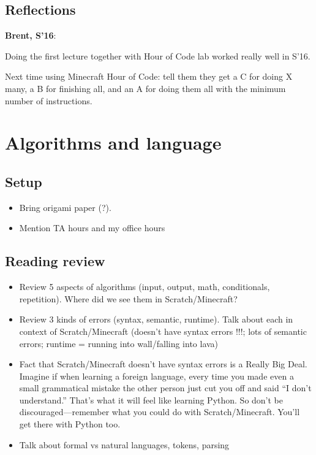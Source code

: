 \documentclass{article}
\newenvironment{reflect}[1]
{
  \begin{lrbox}{\reflectbox}
    \begin{minipage}[t]{\textwidth}
      \textbf{#1}:
}{
    \end{minipage}
  \end{lrbox}
  \fbox{\usebox{\reflectbox}}
}
\begin{document}
\subsection*{Reflections}

\begin{reflect}{Brent, S'16}
  Doing the first lecture together with Hour of Code lab worked really
  well in S'16.

  Next time using Minecraft Hour of Code: tell them they get a C for
  doing X many, a B for finishing all, and an A for doing them all
  with the minimum number of instructions.
\end{reflect}

\newpage

\section{Algorithms and language}

\subsection*{Setup}

\begin{itemize}
\item Bring origami paper (?).
\item Mention TA hours and my office hours
\end{itemize}

\subsection*{Reading review}

\begin{itemize}
\item Review 5 aspects of algorithms (input, output, math,
  conditionals, repetition).  Where did we see them in
  Scratch/Minecraft?
\item Review 3 kinds of errors (syntax, semantic, runtime).  Talk
  about each in context of Scratch/Minecraft (doesn't have syntax
  errors !!!; lots of semantic errors; runtime = running into
  wall/falling into lava)
\item Fact that Scratch/Minecraft doesn't have syntax errors is a
  Really Big Deal.  Imagine if when learning a foreign language, every
  time you made even a small grammatical mistake the other person just
  cut you off and said ``I don't understand.''  That's what it will
  feel like learning Python.  So don't be discouraged---remember what
  you could do with Scratch/Minecraft.  You'll get there with Python
  too.
\item Talk about formal vs natural languages, tokens, parsing
\end{itemize}
\end{document}
